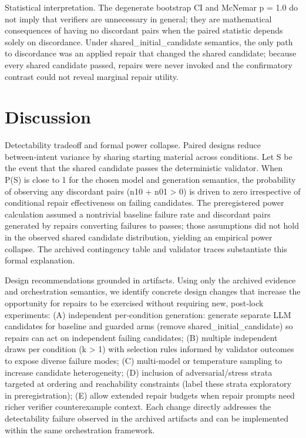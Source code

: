 \documentclass[conference]{IEEEtran}
\begin{document}
Statistical interpretation. The degenerate bootstrap CI and McNemar p = 1.0 do not imply that verifiers are unnecessary in general; they are mathematical consequences of having no discordant pairs when the paired statistic depends solely on discordance. Under shared\_initial\_candidate semantics, the only path to discordance was an applied repair that changed the shared candidate; because every shared candidate passed, repairs were never invoked and the confirmatory contrast could not reveal marginal repair utility.

\section{Discussion}
Detectability tradeoff and formal power collapse. Paired designs reduce between‑intent variance by sharing starting material across conditions. Let S be the event that the shared candidate passes the deterministic validator. When P(S) is close to 1 for the chosen model and generation semantics, the probability of observing any discordant pairs (n10 + n01 > 0) is driven to zero irrespective of conditional repair effectiveness on failing candidates. The preregistered power calculation assumed a nontrivial baseline failure rate and discordant pairs generated by repairs converting failures to passes; those assumptions did not hold in the observed shared candidate distribution, yielding an empirical power collapse. The archived contingency table and validator traces substantiate this formal explanation.

Design recommendations grounded in artifacts. Using only the archived evidence and orchestration semantics, we identify concrete design changes that increase the opportunity for repairs to be exercised without requiring new, post‑lock experiments: (A) independent per‑condition generation: generate separate LLM candidates for baseline and guarded arms (remove shared\_initial\_candidate) so repairs can act on independent failing candidates; (B) multiple independent draws per condition (k > 1) with selection rules informed by validator outcomes to expose diverse failure modes; (C) multi‑model or temperature sampling to increase candidate heterogeneity; (D) inclusion of adversarial/stress strata targeted at ordering and reachability constraints (label these strata exploratory in preregistration); (E) allow extended repair budgets when repair prompts need richer verifier counterexample context. Each change directly addresses the detectability failure observed in the archived artifacts and can be implemented within the same orchestration framework.
\end{document}
